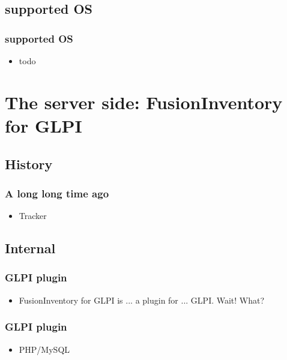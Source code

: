 \documentclass{beamer}
\begin{document}
\subsection{supported OS}
\begin{frame}
\frametitle{supported OS}
%
\begin{itemize}
%
\item todo 
%
\end{itemize}
\end{frame}

\section{The server side: FusionInventory for GLPI}
%
%
\subsection{History}
\begin{frame}
\frametitle{A long long time ago}
%
\begin{itemize}
\item Tracker 
%
\end{itemize}
\end{frame}

\subsection{Internal}
\begin{frame}
\frametitle{GLPI plugin}
%
\begin{itemize}
\item FusionInventory for GLPI is ... a plugin for ... GLPI. Wait! What? 
%
\end{itemize}
\end{frame}

\begin{frame}
\frametitle{GLPI plugin}
%
\begin{itemize}
\item PHP/MySQL
%
\end{itemize}
\end{frame}
\end{document}
